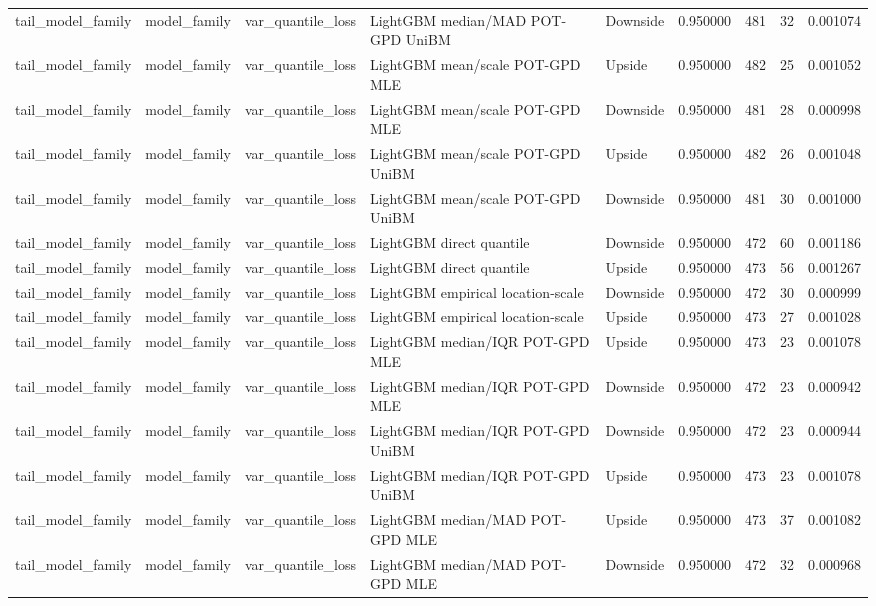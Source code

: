 \begin{tabular}{lllllrrr}
tail\_model\_family & model\_family & var\_quantile\_loss & LightGBM median/MAD POT-GPD UniBM & Downside & 0.950000 & 481 & 32 & 0.001074 \\
tail\_model\_family & model\_family & var\_quantile\_loss & LightGBM mean/scale POT-GPD MLE & Upside & 0.950000 & 482 & 25 & 0.001052 \\
tail\_model\_family & model\_family & var\_quantile\_loss & LightGBM mean/scale POT-GPD MLE & Downside & 0.950000 & 481 & 28 & 0.000998 \\
tail\_model\_family & model\_family & var\_quantile\_loss & LightGBM mean/scale POT-GPD UniBM & Upside & 0.950000 & 482 & 26 & 0.001048 \\
tail\_model\_family & model\_family & var\_quantile\_loss & LightGBM mean/scale POT-GPD UniBM & Downside & 0.950000 & 481 & 30 & 0.001000 \\
tail\_model\_family & model\_family & var\_quantile\_loss & LightGBM direct quantile & Downside & 0.950000 & 472 & 60 & 0.001186 \\
tail\_model\_family & model\_family & var\_quantile\_loss & LightGBM direct quantile & Upside & 0.950000 & 473 & 56 & 0.001267 \\
tail\_model\_family & model\_family & var\_quantile\_loss & LightGBM empirical location-scale & Downside & 0.950000 & 472 & 30 & 0.000999 \\
tail\_model\_family & model\_family & var\_quantile\_loss & LightGBM empirical location-scale & Upside & 0.950000 & 473 & 27 & 0.001028 \\
tail\_model\_family & model\_family & var\_quantile\_loss & LightGBM median/IQR POT-GPD MLE & Upside & 0.950000 & 473 & 23 & 0.001078 \\
tail\_model\_family & model\_family & var\_quantile\_loss & LightGBM median/IQR POT-GPD MLE & Downside & 0.950000 & 472 & 23 & 0.000942 \\
tail\_model\_family & model\_family & var\_quantile\_loss & LightGBM median/IQR POT-GPD UniBM & Downside & 0.950000 & 472 & 23 & 0.000944 \\
tail\_model\_family & model\_family & var\_quantile\_loss & LightGBM median/IQR POT-GPD UniBM & Upside & 0.950000 & 473 & 23 & 0.001078 \\
tail\_model\_family & model\_family & var\_quantile\_loss & LightGBM median/MAD POT-GPD MLE & Upside & 0.950000 & 473 & 37 & 0.001082 \\
tail\_model\_family & model\_family & var\_quantile\_loss & LightGBM median/MAD POT-GPD MLE & Downside & 0.950000 & 472 & 32 & 0.000968 \\

\end{tabular}
